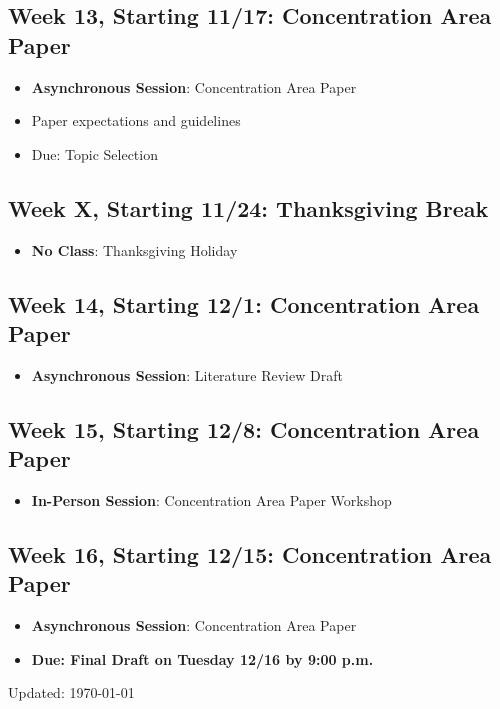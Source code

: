 \documentclass[12pt]{article}     %
\begin{document}
\subsection*{Week 13, Starting 11/17: Concentration Area Paper}
\begin{itemize}
    \item \textbf{Asynchronous Session}: Concentration Area Paper
    \item Paper expectations and guidelines 
    \item Due: Topic Selection
\end{itemize}

\subsection*{Week X, Starting 11/24: Thanksgiving Break}
\begin{itemize}
    \item \textbf{No Class}: Thanksgiving Holiday
\end{itemize}

\subsection*{Week 14, Starting 12/1: Concentration Area Paper}
\begin{itemize}
    \item \textbf{Asynchronous Session}: Literature Review Draft
\end{itemize}

\subsection*{Week 15, Starting 12/8: Concentration Area Paper}
\begin{itemize}
    \item \textbf{In-Person Session}: Concentration Area Paper Workshop
\end{itemize}

\subsection*{Week 16, Starting 12/15: Concentration Area Paper}
\begin{itemize}
    \item \textbf{Asynchronous Session}: Concentration Area Paper
    \item \textbf{Due: Final Draft on Tuesday 12/16 by 9:00 p.m.}
\end{itemize}


\newpage


            \singlespace
            
            
\vspace{1cm}
\begin{flushright}
Updated: \today
\end{flushright}
\end{document}
